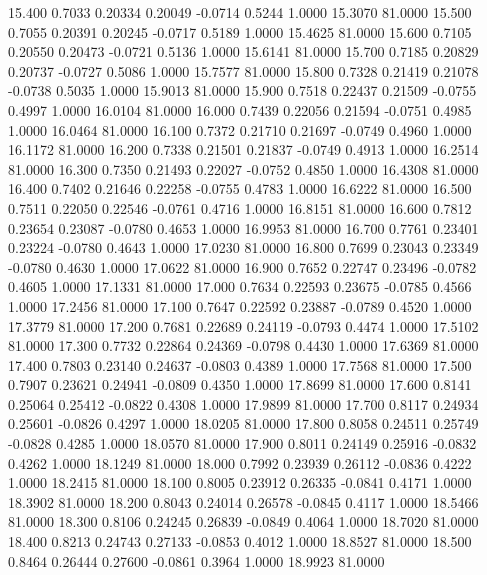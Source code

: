   15.400   0.7033   0.20334   0.20049  -0.0714   0.5244   1.0000  15.3070  81.0000
  15.500   0.7055   0.20391   0.20245  -0.0717   0.5189   1.0000  15.4625  81.0000
  15.600   0.7105   0.20550   0.20473  -0.0721   0.5136   1.0000  15.6141  81.0000
  15.700   0.7185   0.20829   0.20737  -0.0727   0.5086   1.0000  15.7577  81.0000
  15.800   0.7328   0.21419   0.21078  -0.0738   0.5035   1.0000  15.9013  81.0000
  15.900   0.7518   0.22437   0.21509  -0.0755   0.4997   1.0000  16.0104  81.0000
  16.000   0.7439   0.22056   0.21594  -0.0751   0.4985   1.0000  16.0464  81.0000
  16.100   0.7372   0.21710   0.21697  -0.0749   0.4960   1.0000  16.1172  81.0000
  16.200   0.7338   0.21501   0.21837  -0.0749   0.4913   1.0000  16.2514  81.0000
  16.300   0.7350   0.21493   0.22027  -0.0752   0.4850   1.0000  16.4308  81.0000
  16.400   0.7402   0.21646   0.22258  -0.0755   0.4783   1.0000  16.6222  81.0000
  16.500   0.7511   0.22050   0.22546  -0.0761   0.4716   1.0000  16.8151  81.0000
  16.600   0.7812   0.23654   0.23087  -0.0780   0.4653   1.0000  16.9953  81.0000
  16.700   0.7761   0.23401   0.23224  -0.0780   0.4643   1.0000  17.0230  81.0000
  16.800   0.7699   0.23043   0.23349  -0.0780   0.4630   1.0000  17.0622  81.0000
  16.900   0.7652   0.22747   0.23496  -0.0782   0.4605   1.0000  17.1331  81.0000
  17.000   0.7634   0.22593   0.23675  -0.0785   0.4566   1.0000  17.2456  81.0000
  17.100   0.7647   0.22592   0.23887  -0.0789   0.4520   1.0000  17.3779  81.0000
  17.200   0.7681   0.22689   0.24119  -0.0793   0.4474   1.0000  17.5102  81.0000
  17.300   0.7732   0.22864   0.24369  -0.0798   0.4430   1.0000  17.6369  81.0000
  17.400   0.7803   0.23140   0.24637  -0.0803   0.4389   1.0000  17.7568  81.0000
  17.500   0.7907   0.23621   0.24941  -0.0809   0.4350   1.0000  17.8699  81.0000
  17.600   0.8141   0.25064   0.25412  -0.0822   0.4308   1.0000  17.9899  81.0000
  17.700   0.8117   0.24934   0.25601  -0.0826   0.4297   1.0000  18.0205  81.0000
  17.800   0.8058   0.24511   0.25749  -0.0828   0.4285   1.0000  18.0570  81.0000
  17.900   0.8011   0.24149   0.25916  -0.0832   0.4262   1.0000  18.1249  81.0000
  18.000   0.7992   0.23939   0.26112  -0.0836   0.4222   1.0000  18.2415  81.0000
  18.100   0.8005   0.23912   0.26335  -0.0841   0.4171   1.0000  18.3902  81.0000
  18.200   0.8043   0.24014   0.26578  -0.0845   0.4117   1.0000  18.5466  81.0000
  18.300   0.8106   0.24245   0.26839  -0.0849   0.4064   1.0000  18.7020  81.0000
  18.400   0.8213   0.24743   0.27133  -0.0853   0.4012   1.0000  18.8527  81.0000
  18.500   0.8464   0.26444   0.27600  -0.0861   0.3964   1.0000  18.9923  81.0000
